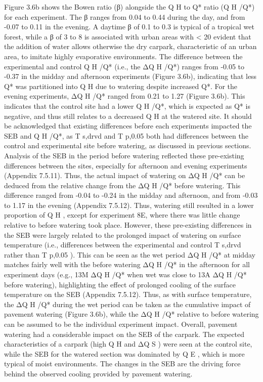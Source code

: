 \documentclass[final,3p,times,authoryear]{elsarticle}
\begin{document}
Figure 3.6b shows the Bowen ratio (β) alongside the Q H to Q* ratio (Q H /Q*) for each
experiment. The β ranges from 0.04 to 0.44 during the day, and from -0.07 to 0.11 in the
evening. A daytime β of 0.1 to 0.3 is typical of a tropical wet forest, while a β of 3 to 8
is associated with urban areas with < 20%
evident that the addition of water allows otherwise the dry carpark, characteristic of an
urban area, to imitate highly evaporative environments.
The difference between the experimental and control Q H /Q* (i.e., the ΔQ H /Q*) ranges
from -0.05 to -0.37 in the midday and afternoon experiments (Figure 3.6b), indicating
that less Q* was partitioned into Q H due to watering despite increased Q*. For the
evening experiments, ΔQ H /Q* ranged from 0.21 to 1.27 (Figure 3.6b). This indicates
that the control site had a lower Q H /Q*, which is expected as Q* is negative, and thus
still relates to a decreased Q H at the watered site.
It should be acknowledged that existing differences before each experiments impacted
the SEB and Q H /Q*, as T s,drvd and T p,0.05 both had differences between the control and
experimental site before watering, as discussed in previous sections. Analysis of the
SEB in the period before watering reflected these pre-existing differences between the
sites, especially for afternoon and evening experiments (Appendix 7.5.11). Thus, the
actual impact of watering on ΔQ H /Q* can be deduced from the relative change from the
ΔQ H /Q* before watering. This difference ranged from -0.04 to -0.24 in the midday and afternoon, and from -0.03 to 1.17 in the evening (Appendix 7.5.12). Thus, watering still
resulted in a lower proportion of Q H , except for experiment 8E, where there was little
change relative to before watering took place.
However, these pre-existing differences in the SEB were largely related to the prolonged
impact of watering on surface temperature (i.e., differences between the experimental
and control T s,drvd rather than T p,0.05 ). This can be seen as the wet period ΔQ H /Q* at
midday matches fairly well with the before watering ΔQ H /Q* in the afternoon for all
experiment days (e.g., 13M ΔQ H /Q* when wet was close to 13A ΔQ H /Q* before
watering), highlighting the effect of prolonged cooling of the surface temperature on the
SEB (Appendix 7.5.12). Thus, as with surface temperature, the ΔQ H /Q* during the wet
period can be taken as the cumulative impact of pavement watering (Figure 3.6b), while
the ΔQ H /Q* relative to before watering can be assumed to be the individual experiment
impact.
Overall, pavement watering had a considerable impact on the SEB of the carpark. The
expected characteristics of a carpark (high Q H and ΔQ S ) were seen at the control site,
while the SEB for the watered section was dominated by Q E , which is more typical of
moist environments. The changes in the SEB are the driving force behind the observed
cooling provided by pavement watering.
\end{document}
